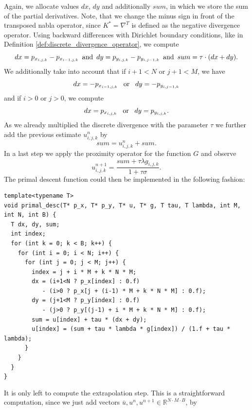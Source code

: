 \documentclass[abstracton]{scrreprt}
\begin{document}
                Again, we allocate values $dx$, $dy$ and additionally $sum$, in which we store the sum of the partial derivatives. Note, that we change the minus sign in front of the transposed nabla operator, since $K^{\ast} = \nabla^{T}$ is defined as the negative divergence operator. Using backward differences with Dirichlet boundary conditions, like in Definition \ref{def:discrete_divergence_operator}, we compute
                    $$
                        dx = p_{x_{i,j,k}} - p_{x_{i-1,j,k}} \,\,\, \textnormal{and} \,\,\, dy = p_{y_{i,j,k}} - p_{y_{i,j-1,k}} \,\,\, \textnormal{and} \,\,\, sum = \tau \cdot (dx + dy).
                    $$
                We additionally take into account that if $i + 1 < N$ or $j + 1 < M$, we have
                    $$
                        dx = -p_{x_{i-1,j,k}} \,\,\,\,\, \textnormal{or} \,\,\,\,\, dy = -p_{y_{i,j-1,k}}
                    $$
                and if $i > 0$ or $j > 0$, we compute
                    $$
                        dx = p_{x_{i,j,k}} \,\,\,\,\, \textnormal{or} \,\,\,\,\, dy = p_{y_{i,j,k}}.
                    $$
                As we already multiplied the discrete divergence with the parameter $\tau$ we further add the previous estimate $u_{i,j,k}^{n}$ by
                    $$
                        sum = u_{i,j,k}^{n} + sum.
                    $$
                In a last step we apply the proximity operator for the function $G$ and observe
                    $$
                        u_{i,j,k}^{n+1} = \frac{sum + \tau\lambda g_{i,j,k}}{1 + \tau\sigma}.
                    $$
                The primal descent function could then be implemented in the following fashion:
                    \begin{lstlisting}
template<typename T>
void primal_desc(T* p_x, T* p_y, T* u, T* g, T tau, T lambda, int M, int N, int B) {
  T dx, dy, sum;
  int index;
  for (int k = 0; k < B; k++) {
    for (int i = 0; i < N; i++) {
      for (int j = 0; j < M; j++) {
        index = j + i * M + k * N * M;
        dx = (i+1<N ? p_x[index] : 0.f)
           - (i>0 ? p_x[j + (i-1) * M + k * N * M] : 0.f);
        dy = (j+1<M ? p_y[index] : 0.f)
           - (j>0 ? p_y[(j-1) + i * M + k * N * M] : 0.f);
        sum = u[index] + tau * (dx + dy);
        u[index] = (sum + tau * lambda * g[index]) / (1.f + tau * lambda);
      }
    }
  }
}
                \end{lstlisting}
                It is only left to compute the extrapolation step. This is a straightforward computation, since we just add vectors $\bar{u}, u^{n}, u^{n+1} \in \mathbb{R}^{N \cdot M \cdot B}$, by
\end{document}
